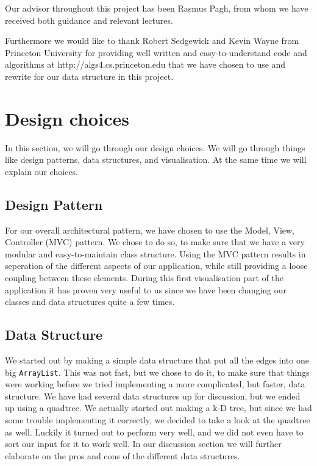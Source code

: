 \documentclass[a4paper,11pt]{article}
\begin{document}
Our advisor throughout this project has been Rasmus Pagh, from whom we have received both guidance and relevant lectures. 

Furthermore we would like to thank Robert Sedgewick and Kevin Wayne from Princeton University for providing well written and easy-to-understand code and algorithms at http://algs4.cs.princeton.edu that we have chosen to use and rewrite for our data structure in this project.

\pagebreak
\section{Design choices} %
\label{sec:Design choices}
In this section, we will go through our design choices. We will go through things like design patterns, data structures, and visualisation.
At the same time we will explain our choices.

\subsection{Design Pattern} %
\label{sub:Design Pattern}
For our overall architectural pattern, we have chosen to use the Model, View, Controller (MVC) pattern. We chose to do so, to make sure that we have
a very modular and easy-to-maintain class structure. Using the MVC pattern results in seperation of the different aspects of our application, while still providing a loose coupling between these elements. During this first visualisation part of the application it has proven very useful to us since we
have been changing our classes and data structures quite a few times.


\subsection{Data Structure} %
\label{sub:Data Structure}
We started out by making a simple data structure that put all the edges into one big \texttt{ArrayList}. This was not fast, but we chose to do it, to make sure that
things were working before we tried implementing a more complicated, but faster, data structure. We have had several data structures up for discussion, but we ended up using a quadtree. We actually started out making a k-D tree, but since we had some trouble implementing it correctly, we decided to take a look at
the quadtree as well. Luckily it turned out to perform very well, and we did not even have to sort our input for it to work well. In our discussion 
section we will further elaborate on the pros and cons of the different data structures.
\end{document}
